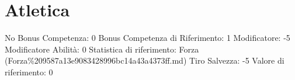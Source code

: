\section{Atletica}\label{atletica}

\begin{description}
\tightlist
\item[Tags: ABI]
No Bonus Competenza: 0 Bonus Competenza di Riferimento: 1 Modificatore:
-5 Modificatore Abilità: 0 Statistica di riferimento: Forza
(Forza\%209587a13e9083428996bc14a43a4373ff.md) Tiro Salvezza: -5 Valore
di riferimento: 0
\end{description}
